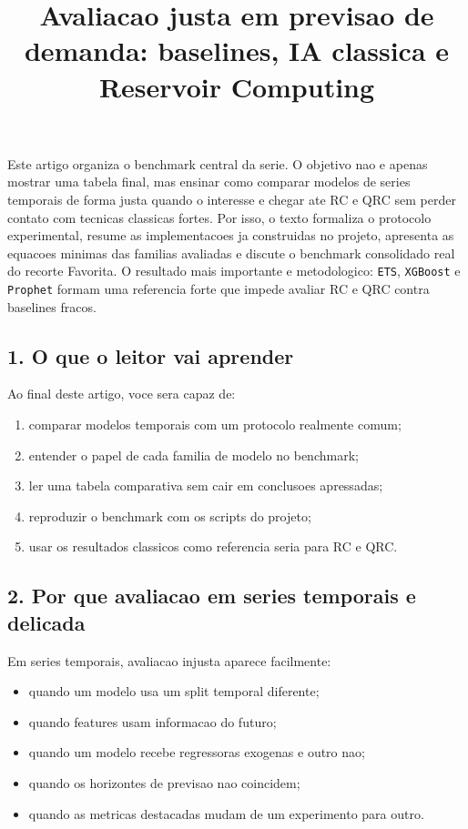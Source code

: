\documentclass[12pt]{article}
\title{Avaliacao justa em previsao de demanda: baselines, IA classica e Reservoir Computing}
\author{}
\providecommand{\tightlist}{%
          \setlength{\itemsep}{0pt}\setlength{\parskip}{0pt}}
\begin{document}
        \maketitle

        \begin{resumo}
        Este artigo organiza o benchmark central da serie. O objetivo nao e apenas mostrar uma tabela final, mas ensinar como comparar modelos de series temporais de forma justa quando o interesse e chegar ate RC e QRC sem perder contato com tecnicas classicas fortes. Por isso, o texto formaliza o protocolo experimental, resume as implementacoes ja construidas no projeto, apresenta as equacoes minimas das familias avaliadas e discute o benchmark consolidado real do recorte Favorita. O resultado mais importante e metodologico: \texttt{ETS}, \texttt{XGBoost} e \texttt{Prophet} formam uma referencia forte que impede avaliar RC e QRC contra baselines fracos.
        \end{resumo}

        \subsection{1. O que o leitor vai aprender}\label{1-o-que-o-leitor-vai-aprender}

Ao final deste artigo, voce sera capaz de:

\begin{enumerate}
\def\labelenumi{\arabic{enumi}.}
\tightlist
\item
  comparar modelos temporais com um protocolo realmente comum;
\item
  entender o papel de cada familia de modelo no benchmark;
\item
  ler uma tabela comparativa sem cair em conclusoes apressadas;
\item
  reproduzir o benchmark com os scripts do projeto;
\item
  usar os resultados classicos como referencia seria para RC e QRC.
\end{enumerate}

\subsection{2. Por que avaliacao em series temporais e delicada}\label{2-por-que-avaliacao-em-series-temporais-e-delicada}

Em series temporais, avaliacao injusta aparece facilmente:

\begin{itemize}
\tightlist
\item
  quando um modelo usa um split temporal diferente;
\item
  quando features usam informacao do futuro;
\item
  quando um modelo recebe regressoras exogenas e outro nao;
\item
  quando os horizontes de previsao nao coincidem;
\item
  quando as metricas destacadas mudam de um experimento para outro.
\end{itemize}
\end{document}
